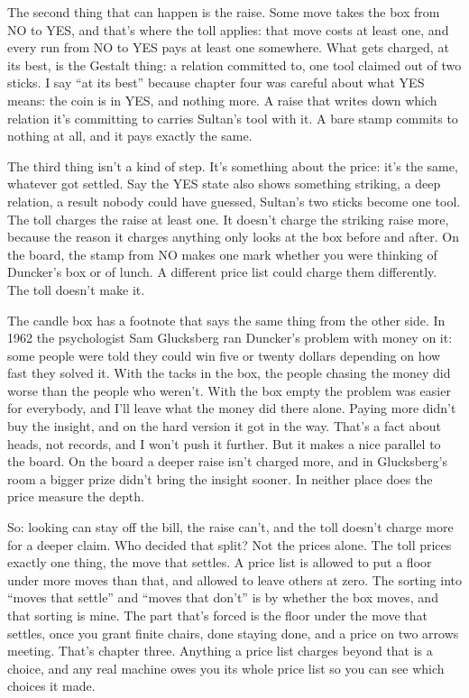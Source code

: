 \documentclass[11pt,twoside]{article}
\theoremstyle{thielethm}
\theoremstyle{thieledef}
\theoremstyle{thieledef}
\theoremstyle{thieledef}
\theoremstyle{thielethm}
\theoremstyle{thieleobs}
\theoremstyle{thielethm}
\begin{document}
The second thing that can happen is the raise. Some move takes the box from NO to YES, and that's where the toll applies: that move costs at least one, and every run from NO to YES pays at least one somewhere. What gets charged, at its best, is the Gestalt thing: a relation committed to, one tool claimed out of two sticks. I say ``at its best'' because chapter four was careful about what YES means: the coin is in YES, and nothing more. A raise that writes down which relation it's committing to carries Sultan's tool with it. A bare stamp commits to nothing at all, and it pays exactly the same.

The third thing isn't a kind of step. It's something about the price: it's the same, whatever got settled. Say the YES state also shows something striking, a deep relation, a result nobody could have guessed, Sultan's two sticks become one tool. The toll charges the raise at least one. It doesn't charge the striking raise more, because the reason it charges anything only looks at the box before and after. On the board, the stamp from NO makes one mark whether you were thinking of Duncker's box or of lunch. A different price list could charge them differently. The toll doesn't make it.

The candle box has a footnote that says the same thing from the other side. In 1962 the psychologist Sam Glucksberg ran Duncker's problem with money on it: some people were told they could win five or twenty dollars depending on how fast they solved it. With the tacks in the box, the people chasing the money did worse than the people who weren't. With the box empty the problem was easier for everybody, and I'll leave what the money did there alone. Paying more didn't buy the insight, and on the hard version it got in the way. That's a fact about heads, not records, and I won't push it further. But it makes a nice parallel to the board. On the board a deeper raise isn't charged more, and in Glucksberg's room a bigger prize didn't bring the insight sooner. In neither place does the price measure the depth.

So: looking can stay off the bill, the raise can't, and the toll doesn't charge more for a deeper claim. Who decided that split? Not the prices alone. The toll prices exactly one thing, the move that settles. A price list is allowed to put a floor under more moves than that, and allowed to leave others at zero. The sorting into ``moves that settle'' and ``moves that don't'' is by whether the box moves, and that sorting is mine. The part that's forced is the floor under the move that settles, once you grant finite chairs, done staying done, and a price on two arrows meeting. That's chapter three. Anything a price list charges beyond that is a choice, and any real machine owes you its whole price list so you can see which choices it made.
\end{document}
